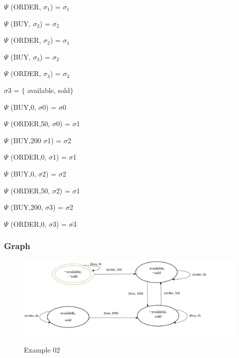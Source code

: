 \documentclass[11pt]{article}
\begin{document}
	\(  \Psi  \)  (ORDER, $ \sigma _{1}$) = $ \sigma _{1}$\par
	
	\(  \Psi  \)  (BUY, $ \sigma _{2}$) = $ \sigma _{2}$\par
	
	\(  \Psi  \)  (ORDER, $ \sigma _{2}$) = $ \sigma _{1}$\par
	
	\(  \Psi  \)  (BUY, $ \sigma _{3}$) = $ \sigma _{2}$\par
	
	\(  \Psi  \)  (ORDER, $ \sigma _{3}$) = $ \sigma _{3}$\par

	$ \sigma $3 = $ \{ $ available, sold$ \} $ \par
	\(  \Psi  \)  (BUY,0, $ \sigma $0) = $ \sigma $0\par
	
	\(  \Psi  \)  (ORDER,50, $ \sigma $0) = $ \sigma $1\par
	
	\(  \Psi  \)  (BUY,200 $ \sigma $1) = $ \sigma $2\par
	
	\(  \Psi  \)  (ORDER,0, $ \sigma $1) = $ \sigma $1\par
	
	\(  \Psi  \)  (BUY,0, $ \sigma $2) = $ \sigma $2\par
	
	\(  \Psi  \)  (ORDER,50, $ \sigma $2) = $ \sigma $1\par
	
	\(  \Psi  \)  (BUY,200, $ \sigma $3) = $ \sigma $2\par
	
	\(  \Psi  \)  (ORDER,0, $ \sigma $3) = $ \sigma $3\par

	\subsubsection{Graph}\label{par:p402}
	\begin{figure}[H]
		\includegraphics[width=1.2\linewidth, height=0.4\textheight]{./media/example2_graph.png}
		\label{Figure:f02}
		\caption{Example 02}
	\end{figure}
\end{document}
